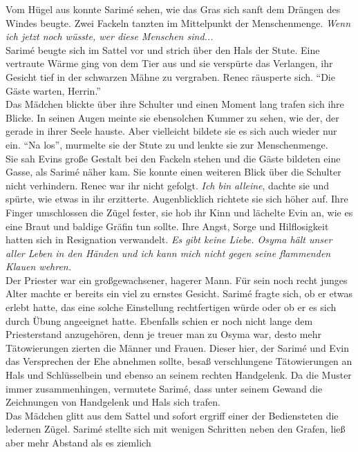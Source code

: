 Vom Hügel aus konnte Sarimé sehen, wie das Gras sich sanft dem Drängen des Windes beugte. Zwei 
Fackeln tanzten im Mittelpunkt der Menschenmenge. \textit{Wenn ich jetzt noch wüsste, wer diese 
Menschen sind...}\\
Sarimé beugte sich im Sattel vor und strich über den Hals der Stute. Eine vertraute Wärme ging von 
dem Tier aus und sie verspürte das Verlangen, ihr Gesicht tief in der schwarzen Mähne zu vergraben.
Renec räusperte sich. ``Die Gäste warten, Herrin.''\\
Das Mädchen blickte über ihre Schulter und einen Moment lang trafen sich ihre Blicke. In seinen 
Augen meinte sie ebensolchen Kummer zu sehen, wie der, der gerade in ihrer Seele hauste. Aber 
vielleicht bildete sie es sich auch wieder nur ein. ``Na los'', murmelte sie der Stute zu und 
lenkte sie zur Menschenmenge.\\
Sie sah Evins große Gestalt bei den Fackeln stehen und die Gäste bildeten eine Gasse, als Sarimé 
näher kam. Sie konnte einen weiteren Blick über die Schulter nicht verhindern. Renec war ihr nicht 
gefolgt. \textit{Ich bin alleine}, dachte sie und spürte, wie etwas in ihr erzitterte. 
Augenblicklich richtete sie sich höher auf. Ihre Finger umschlossen die Zügel fester, sie hob ihr 
Kinn und lächelte Evin an, wie es eine Braut und baldige Gräfin tun sollte. Ihre Angst, Sorge und 
Hilflosigkeit hatten sich in Resignation verwandelt. \textit{Es gibt keine Liebe. Osyma hält unser 
aller Leben in den Händen und ich kann mich nicht gegen seine flammenden Klauen wehren.}\\
Der Priester war ein großgewachsener, hagerer Mann. Für sein noch recht junges Alter machte er 
bereits ein viel zu ernstes Gesicht. Sarimé fragte sich, ob er etwas erlebt hatte, das eine solche 
Einstellung rechtfertigen würde oder ob er es sich durch Übung angeeignet hatte. Ebenfalls schien 
er noch nicht lange dem Priesterstand anzugehören, denn je treuer man zu Osyma war, desto mehr 
Tätowierungen zierten die Männer und Frauen. Dieser hier, der Sarimé und Evin das Versprechen der 
Ehe abnehmen sollte, besaß verschlungene Tätowierungen an Hals und Schlüsselbein und ebenso an 
seinem rechten Handgelenk. Da die Muster immer zusammenhingen, vermutete Sarimé, dass unter seinem 
Gewand die Zeichnungen von Handgelenk und Hals sich trafen.\\ 
Das Mädchen glitt aus dem Sattel und sofort ergriff einer der Bediensteten die ledernen Zügel. 
Sarimé stellte sich mit wenigen Schritten neben den Grafen, ließ aber mehr Abstand als es ziemlich 
